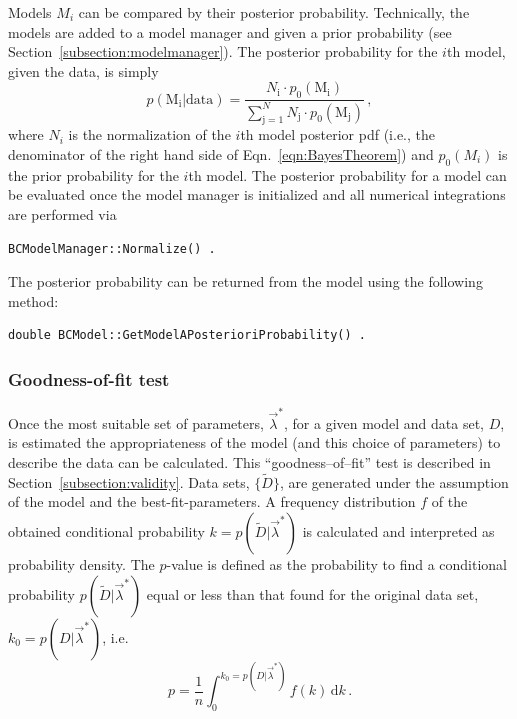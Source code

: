 \documentclass[11pt, a4paper]{article}
\begin{document}
Models $M_{i}$ can be compared by their posterior
probability. Technically, the models are added to a model manager and
given a prior probability (see
Section~\ref{subsection:modelmanager}). The posterior probability for
the $i$th model, given the data, is simply
%
\begin{equation}
p(\mathrm{M_{i}}|\mathrm{data}) = \frac{N_{\mathrm{i}} \cdot p_{0}(\mathrm{M_{i}})}{\sum_{\mathrm{j} = 1}^{N} N_{\mathrm{j}} \cdot p_{0}(\mathrm{M_{j}})} \, , 
\end{equation}
%
where $N_{i}$ is the normalization of the $i$th model posterior pdf
(i.e., the denominator of the right hand side of
Eqn.~\ref{eqn:BayesTheorem}) and $p_{0}(M_{i})$ is the prior
probability for the $i$th model. The posterior probability for a model
can be evaluated once the model manager is initialized and all
numerical integrations are performed via 
%
\begin{verbatim}
BCModelManager::Normalize() . 
\end{verbatim}
%
The posterior probability can be returned from the model using the
following method:
%
\begin{verbatim}
double BCModel::GetModelAPosterioriProbability() . 
\end{verbatim}


\subsubsection{Goodness-of-fit test} 

Once the most suitable set of parameters, $\vec{\lambda}^{*}$, for a
given model and data set, $D$, is estimated the appropriateness of the
model (and this choice of parameters) to describe the data can be
calculated. This ``goodness--of--fit'' test is described in
Section~\ref{subsection:validity}. Data sets, $\{ \tilde{D} \}$, are
generated under the assumption of the model and the
best-fit-parameters. A frequency distribution $f$ of the obtained
conditional probability $k=p(\tilde{D}|\vec{\lambda}^{*})$ is
calculated and interpreted as probability density. The $p$-value is
defined as the probability to find a conditional probability
$p(\tilde{D}|\vec{\lambda}^{*})$ equal or less than that found for the
original data set, $k_{0}=p(D|\vec{\lambda}^{*})$, i.e.
%
\begin{equation}
p = \frac{1}{n} \int_{0}^{k_{0}=p(D|\vec{\lambda}^{*})} f(k) \, \mathrm{d}k \, . 
\end{equation} 
\end{document}
